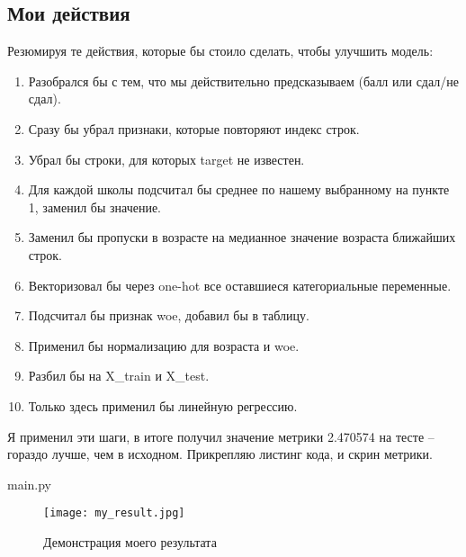 \subsection*{Мои действия}
Резюмируя те действия, которые бы стоило сделать, чтобы улучшить модель:
\begin{enumerate}
	\item Разобрался бы с тем, что мы действительно предсказываем (балл или сдал/не сдал).
	\item Сразу бы убрал признаки, которые повторяют индекс строк.
	\item Убрал бы строки, для которых target не известен.
	\item Для каждой школы подсчитал бы среднее по нашему выбранному на пункте 1, заменил бы значение.
	\item Заменил бы пропуски в возрасте на медианное значение возраста ближайших строк.
	\item Векторизовал бы через one-hot все оставшиеся категориальные переменные.
	\item Подсчитал бы признак woe, добавил бы в таблицу.
	\item Применил бы нормализацию для возраста и woe.
	\item Разбил бы на X\_train и X\_test.
	\item Только здесь применил бы линейную регрессию.
\end{enumerate}

Я применил эти шаги, в итоге получил значение метрики 2.470574 на тесте -- гораздо лучше, чем в исходном.
Прикрепляю листинг кода, и скрин метрики.

\begin{lstinputlisting}[language=Python, caption=Листинг кода, linerange={1-85}, 
	basicstyle=\footnotesize\ttfamily, frame=single]{main.py}
\end{lstinputlisting}


\begin{figure}[h]
	\begin{center}
		\texttt{[image: my\_result.jpg]}
	\end{center}
	\caption{Демонстрация моего результата}
\end{figure}